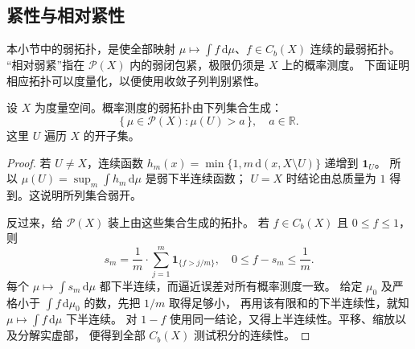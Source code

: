 \subsection{紧性与相对紧性}
\label{b1:subsec:120402}

本小节中的弱拓扑，是使全部映射
\(\mu\mapsto\int f\,\mathrm{d}\mu\)、\(f\in C_b(X)\) 连续的最弱拓扑。
“相对弱紧”指在 \(\mathcal P(X)\) 内的弱闭包紧，极限仍须是 \(X\) 上的概率测度。
下面证明相应拓扑可以度量化，以便使用收敛子列判别紧性。

\begin{lemma}\label{b1:lem:probability-open-topology}
设 \(X\) 为度量空间。概率测度的弱拓扑由下列集合生成：
\[
 \{\,\mu\in\mathcal P(X):\mu(U)>a\,\},
 \quad a\in\mathbb R.
\]
这里 \(U\) 遍历 \(X\) 的开子集。
\end{lemma}
\begin{proof}
若 \(U\ne X\)，连续函数
\(h_m(x)=\min\{1,m\,\mathrm{d}(x,X\setminus U)\}\) 递增到 \(\mathbf1_U\)。
所以 \(\mu(U)=\sup_m\int h_m\,\mathrm{d}\mu\) 是弱下半连续函数；
\(U=X\) 时结论由总质量为 \(1\) 得到。这说明所列集合弱开。

反过来，给 \(\mathcal P(X)\) 装上由这些集合生成的拓扑。
若 \(f\in C_b(X)\) 且 \(0\leq f\leq1\)，则
\[
 s_m=\frac1m\cdot\sum_{j=1}^{m}\mathbf1_{\{f>j/m\}},
 \quad 0\leq f-s_m\leq\frac1m.
\]
每个 \(\mu\mapsto\int s_m\,\mathrm{d}\mu\) 都下半连续，而逼近误差对所有概率测度一致。
给定 \(\mu_0\) 及严格小于 \(\int f\,\mathrm{d}\mu_0\) 的数，先把 \(1/m\) 取得足够小，
再用该有限和的下半连续性，就知 \(\mu\mapsto\int f\,\mathrm{d}\mu\) 下半连续。
对 \(1-f\) 使用同一结论，又得上半连续性。平移、缩放以及分解实虚部，
便得到全部 \(C_b(X)\) 测试积分的连续性。
\end{proof}

